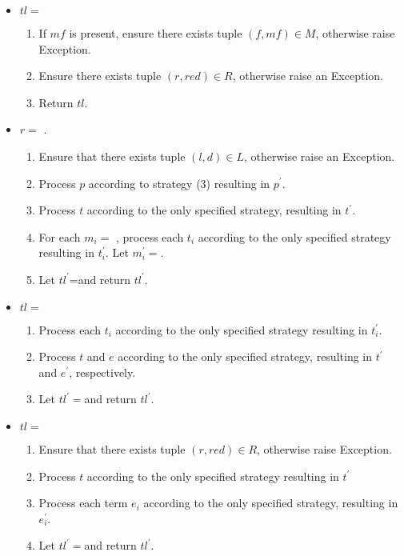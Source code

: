 \begin{itemize}
\item $tl=$ \ReadFromStdinAndApplyReductionRelation
\begin{enumerate}
\item If $mf$ is present, ensure there exists tuple $(f, mf) \in M$, otherwise raise Exception.
\item Ensure there exists tuple $(r, red) \in R$, otherwise raise an Exception.
\item Return $tl$.
\end{enumerate}


\item
$r=$ \RedexMatchAssertEqual.
	\begin{enumerate}
	\item Ensure that there exists tuple $(l, d) \in L$, otherwise raise an Exception.
	\item Process $p$ according to strategy (3) resulting in $p^\prime$.
	\item Process $t$ according to the only specified strategy, resulting in $t^\prime$.
	\item For each $m_i=$ \Match, process each $t_i$ according to the only specified strategy resulting in $t_i^\prime$. Let $m_i^\prime=$\Match[$s_1$][$t_1^\prime$][$s_n$][$t_n^\prime$][false].
	\item Let $tl^\prime$=\RedexMatchAssertEqual[$l$][$p^\prime$][$t^\prime$][$m_1^\prime$][$m_n^\prime$][false] and return $tl^\prime$.
	\end{enumerate}

\item $tl=$ \TermLetAssertEqual
	\begin{enumerate}
	\item  Process each $t_i$ according to the only specified strategy resulting in $t_i^\prime$.
	\item Process $t$ and $e$ according to the only specified strategy, resulting in $t^\prime$ and $e^\prime$, respectively.
	\item Let $tl^\prime=$\TermLetAssertEqual[$v_1$][$n_1$][$t_1^\prime$][$v_m$][$n_m$][$t_m^\prime$][$t^\prime$][$e^\prime$][false] and return $tl^\prime$.
	\end{enumerate}

\item $tl=$ \ApplyReductionRelationAssertEqual
	\begin{enumerate}
	\item Ensure that there exists tuple $(r, red) \in R$, otherwise raise Exception.
	\item Process $t$ according to the only specified strategy resulting in $t^\prime$
	\item Process each term $e_i$ according to the only specified strategy, resulting in $e_i^\prime$.
	\item Let $tl^\prime=$\ApplyReductionRelationAssertEqual[$r$][$t^\prime$][$e_1^\prime$][$e_n^\prime$][false] and return $tl^\prime$.
	\end{enumerate}
\end{itemize}

